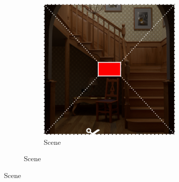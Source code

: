 \begin{figure}[]
    \centering    
    \begin{subfigure}{\textwidth}
        \centering
        \begin{subfigure}{0.5\textwidth}
            \centering
            \includegraphics[width=\textwidth]{images/04-experiment03/staircase_illum/scene.jpg}
            \caption*{Scene}
        \end{subfigure}


\end{subfigure}
\end{figure}
